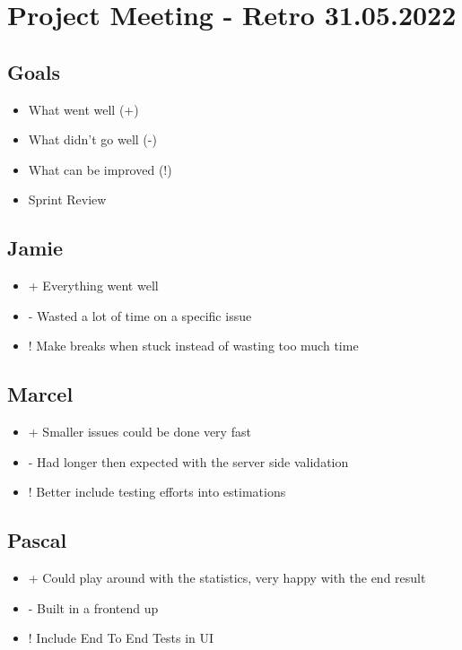 \section{Project Meeting - Retro 31.05.2022}

\subsection{Goals}
\begin{itemize}
    \item What went well (+)
    \item What didn't go well (-)
    \item What can be improved (!)
    \item Sprint Review
\end{itemize}

\subsection{Jamie}
\begin{itemize}
    \item + Everything went well
    \item - Wasted a lot of time on a specific issue
    \item ! Make breaks when stuck instead of wasting too much time
\end{itemize}

\subsection{Marcel}
\begin{itemize}
    \item + Smaller issues could be done very fast
    \item - Had longer then expected with the server side validation
    \item ! Better include testing efforts into estimations
\end{itemize}

\subsection{Pascal}
\begin{itemize}
    \item + Could play around with the statistics, very happy with the end result
    \item - Built in a frontend up
    \item ! Include End To End Tests in UI
\end{itemize}

